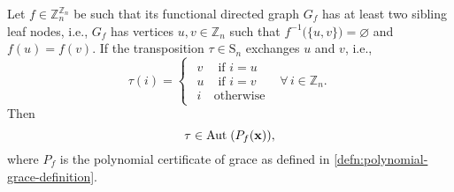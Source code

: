 \begin{lemma}\label{lem:transposition-invariance}
Let $f\in\mathbb{Z}_{n}^{\mathbb{Z}_{n}}$ be such that its functional directed graph $G_{f}$ has at least two sibling leaf nodes, i.e., $G_f$ has vertices $u,v\in\mathbb{Z}_{n}$ such that
$f^{-1}\big(\{u,v\}\big)=\varnothing$ and $f(u)=f(v)$. If
the transposition $\tau\in\textrm{S}_{n}$ exchanges $u$ and
$v$, i.e.,
\[
\tau(i)=\begin{cases}
\begin{array}{cc}
v & \text{ if }i=u\\
u & \text{ if }i=v\\
i & \text{otherwise}
\end{array} & \forall\,i\in\mathbb{Z}_{n}.\end{cases}
\]
Then
\begin{equation}
\tau\in\text{Aut}\;(P_{f}({\bf x})),
\end{equation}
where $P_f$ is the polynomial certificate of grace as defined in \ref{defn:polynomial-grace-definition}.
\end{lemma}
